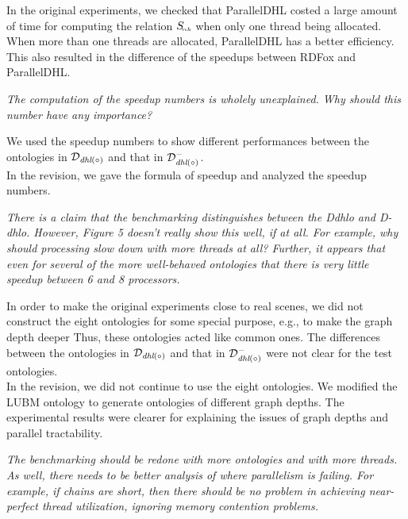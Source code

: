 \documentclass{article}
\let\quoteOld\quote
\let\endquoteOld\endquote
\renewenvironment{quote}{\quoteOld\itshape}{\endquoteOld}
\begin{document}
In the original experiments, we checked that ParallelDHL costed a large amount of time for computing
the relation $S_{\textit{\!\tiny rch}}$ when only one thread being allocated.
When more than one threads are allocated, ParallelDHL has a better efficiency.
This also resulted in the difference of the speedups between RDFox and ParallelDHL.


\begin{quote}
The computation of the speedup numbers is wholely unexplained.  Why should
this number have any importance?
\end{quote}


We used the speedup numbers to show different performances between the
ontologies in $\mathcal{D}_{\textit{\text{dhl}}(\circ)}$ and
that in $\mathcal{D}^-_{\textit{\text{dhl}}(\circ)}$.\\

In the revision, we gave the formula of speedup and analyzed
the speedup numbers.


\begin{quote}
There is a claim that the benchmarking distinguishes between the Ddhlo and
D-dhlo.  However, Figure 5 doesn't really show this well, if at all.   For
example, why should processing slow down with more threads at all?  Further,
it appears that even for several of the more well-behaved ontologies that there
is very little speedup between 6 and 8 processors.
\end{quote}


In order to make the original experiments close to real scenes, we did not
construct the eight ontologies for some special purpose, e.g., to
make the graph depth deeper
Thus, these ontologies acted like common ones.
The differences between the ontologies in
$\mathcal{D}_{\textit{\text{dhl}}(\circ)}$ and that in
$\mathcal{D}^-_{\textit{\text{dhl}}(\circ)}$ were not clear
for the test ontologies.\\

In the revision, we did not continue to use the eight ontologies.
We modified the LUBM ontology to generate ontologies of different graph depths.
The experimental results were clearer for explaining the issues of graph depths
and parallel tractability.


\begin{quote}
The benchmarking should be redone with more ontologies and with more
threads.  As well, there needs to be better analysis of where parallelism is
failing.  For example, if chains are short, then there should be no problem
in achieving near-perfect thread utilization, ignoring memory contention
problems.
\end{quote}
\end{document}
